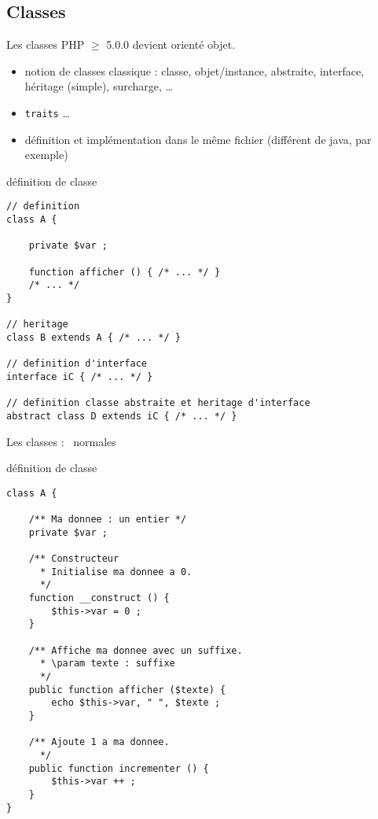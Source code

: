 \subsection{Classes}

\begin{frame}[containsverbatim]{Les classes}
	PHP $\ge$ 5.0.0 devient orienté objet.
	\begin{itemize}
		\item notion de classes classique : classe, objet/instance, abstraite, interface, héritage (simple), surcharge, \ldots
		\item \texttt{traits} \ldots
		\item définition et implémentation dans le même fichier (différent de java, par exemple)
	\end{itemize}
	\begin{block}{définition de classe}
		\begin{lstlisting}
// definition
class A {

	private $var ;

	function afficher () { /* ... */ } 
	/* ... */
} 

// heritage
class B extends A { /* ... */ } 

// definition d'interface
interface iC { /* ... */ } 

// definition classe abstraite et heritage d'interface
abstract class D extends iC { /* ... */ } 
		\end{lstlisting}
	\end{block}
\end{frame}

\begin{frame}[containsverbatim]{Les classes : \guillemotleft~normales~\guillemotright}
	\begin{block}{définition de classe}
		\begin{lstlisting}
class A {

	/** Ma donnee : un entier */
	private $var ;

	/** Constructeur
	  * Initialise ma donnee a 0.
	  */
	function __construct () {
		$this->var = 0 ;
	} 
	
	/** Affiche ma donnee avec un suffixe.
	  * \param texte : suffixe
	  */
	public function afficher ($texte) {
		echo $this->var, " ", $texte ;
	}
	
	/** Ajoute 1 a ma donnee.
	  */
	public function incrementer () {
		$this->var ++ ;
	} 
} 
		\end{lstlisting}
	\end{block}
\end{frame}

